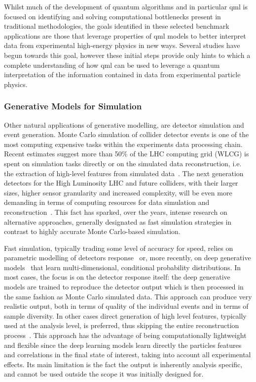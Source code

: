 Whilst much of the development of quantum algorithms and in particular \gls{qml} is focused on identifying and solving computational bottlenecks present in traditional methodologies, the goals identified in these selected benchmark applications are those that leverage properties of \gls{qml} models to better interpret data from experimental high-energy physics in new ways. 
Several studies have begun towards this goal, however these initial steps provide only hints to which a complete understanding of how \gls{qml} can be used to leverage a quantum interpretation of the information contained in data from experimental particle physics.
 
 \subsubsection{Generative Models for Simulation}

 Other natural applications of generative modelling, are detector simulation and event generation.
Monte Carlo simulation of collider detector events is one of the most computing expensive tasks within the experiments data processing chain. Recent estimates suggest more than 50\% of the LHC  computing grid (WLCG) is spent on simulation tasks directly or on the simulated data reconstruction, i.e. the extraction of high-level features from simulated data~\cite{HSF}. The next generation detectors for the  High Luminosity LHC and future colliders, with their larger sizes, higher sensor granularity and increased complexity, will be even more demanding in terms of computing resources for data simulation and reconstruction~\cite{schmidt2016high}. 
This fact has sparked, over the years, intense research on alternative approaches, generally designated as fast simulation strategies in contrast to highly accurate Monte Carlo-based simulation. 

Fast simulation, typically trading some level of accuracy for speed, relies on parametric modelling of detectors response~\cite{ovyn2009delphes} or, more recently, on deep generative models~\cite{khattak2022fast,krause2021caloflow,buhmann2021getting} that learn multi-dimensional, conditional probability distributions.
In most cases, the focus is on the detector response itself: the deep generative models are trained to reproduce the detector output which is then processed in the same fashion as Monte Carlo simulated data. This approach can produce very realistic output, both in terms of quality of the individual events and in terms of sample diversity. In other cases direct generation of high level features, typically used at the analysis level, is preferred, thus skipping the entire reconstruction process~\cite{hashemi2019lhc}. This approach has the advantage of being computationally lightweight and flexible since the deep learning models learn directly the particles features and correlations in the final state of interest, taking into account all experimental effects. Its main limitation is the fact the output is inherently analysis specific, and cannot be used outside the scope it was initially designed for.

